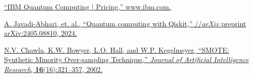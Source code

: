 \documentclass[11pt, oneside]{article}   	%
\begin{document}
\begin{enumerate}[label={[{\arabic*}]}]
   \item \href{https://www.ibm.com/quantum/pricing}{``IBM Quantum Computing | Pricing,” www.ibm.com.}
   
   \item \href{https://doi.org/10.48550/arXiv.2405.08810}{A. Javadi-Abhari, et. al., ``Quantum computing with Qiskit,” //\textit{arXiv} preprint arXiv:2405.08810, 2024.}
   
   \item \href{https://doi.org/10.1613/jair.953}{N.V. Chawla, K.W. Bowyer, L.O. Hall, and W.P. Kegelmeyer, ``SMOTE: Synthetic Minority Over-sampling Technique,” \textit{Journal of Artificial Intelligence Research}, \textbf{16}(16):321–357, 2002.}

\end{enumerate}
\end{document}
